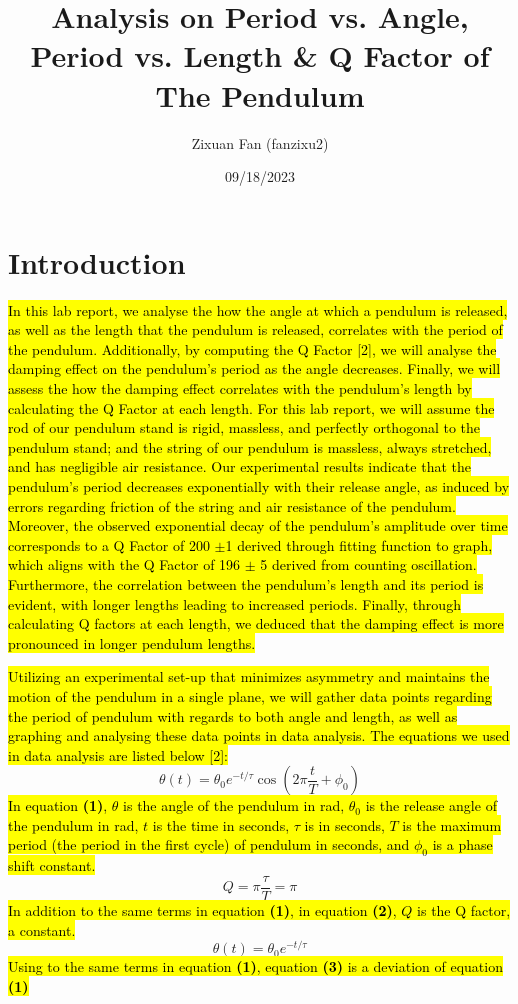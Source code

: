 \documentclass{article}
\title{Analysis on Period vs. Angle, Period vs. Length \& Q Factor of The Pendulum}
\author{Zixuan Fan (fanzixu2)}
\date{09/18/2023}
\begin{document}
\maketitle

\section{Introduction}
\hl{In this lab report, we analyse the how the angle at which a pendulum is released, as well as the length that the pendulum is released, correlates with the period of the pendulum. Additionally, by computing the Q Factor [2], we will analyse the damping effect on the pendulum's period as the angle decreases. Finally, we will assess the how the damping effect correlates with the pendulum's length by calculating the Q Factor at each length. For this lab report, we will assume the rod of our pendulum stand is rigid, massless, and perfectly orthogonal to the pendulum stand; and the string of our pendulum is massless, always stretched, and has negligible air resistance. Our experimental results indicate that the pendulum's period decreases exponentially with their release angle, as induced by errors regarding friction of the string and air resistance of the pendulum. Moreover, the observed exponential decay of the pendulum's amplitude over time corresponds to a Q Factor of 200 $\pm$1 derived through fitting function to graph, which aligns with the Q Factor of 196 $\pm$ 5 derived from counting oscillation. Furthermore, the correlation between the pendulum's length and its period is evident, with longer lengths leading to increased periods. Finally, through calculating Q factors at each length, we deduced that the damping effect is more pronounced in longer pendulum lengths. \\}

\noindent \hl{Utilizing an experimental set-up that minimizes asymmetry and maintains the motion of the pendulum in a single plane, we will gather data points regarding the period of pendulum with regards to both angle and length, as well as graphing and analysing these data points in data analysis. The equations we used in data analysis are listed below [2]: }
\begin{equation} 
 \theta(t) = \theta_0 e^{-t/\tau} \cos(2\pi \frac{t}{T}+\phi_0)
\end{equation}
\hl{ In equation \textbf{(1)}, $\theta$ is the angle of the pendulum in rad,  $\theta_0$ is the release angle of the pendulum in rad, $t$ is the time in seconds, $\tau$ is in seconds, $T$ is the maximum period (the period in the first cycle) of pendulum in seconds, and $\phi_0$ is a phase shift constant. }
\begin{equation}
 Q=\pi \frac{\tau}{T}=\pi
\end{equation}
\hl{In addition to the same terms in equation \textbf{(1)}, in equation \textbf{(2)}, $Q$ is the Q factor, a constant.}
\begin{equation}
 \theta(t) = \theta_0 e^{-t/\tau} 
\end{equation}
\hl{Using to the same terms in equation \textbf{(1)}, equation \textbf{(3)} is a deviation of equation \textbf{(1)} }
\end{document}
